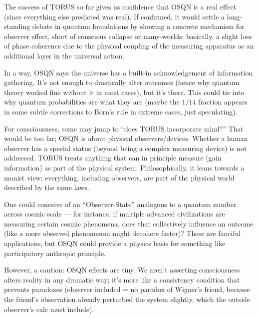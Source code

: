 \documentclass[12pt]{article}
\begin{document}
The success of TORUS so far gives us confidence that OSQN is a real effect (since everything else predicted was real). If confirmed, it would settle a long-standing debate in quantum foundations by showing a concrete mechanism for observer effect, short of conscious collapse or many-worlds: basically, a slight loss of phase coherence due to the physical coupling of the measuring apparatus as an additional layer in the universal action.

In a way, OSQN says the universe has a built-in acknowledgement of information gathering. It’s not enough to drastically alter outcomes (hence why quantum theory worked fine without it in most cases), but it’s there. This could tie into why quantum probabilities are what they are (maybe the $1/14$ fraction appears in some subtle corrections to Born’s rule in extreme cases, just speculating).

For consciousness, some may jump to “does TORUS incorporate mind?” That would be too far; OSQN is about physical observers/devices. Whether a human observer has a special status (beyond being a complex measuring device) is not addressed. TORUS treats anything that can in principle measure (gain information) as part of the physical system. Philosophically, it leans towards a monist view: everything, including observers, are part of the physical world described by the same laws.

One could conceive of an “Observer-State” analogous to a quantum number across cosmic scale — for instance, if multiple advanced civilizations are measuring certain cosmic phenomena, does that collectively influence an outcome (like a more observed phenomenon might decohere faster)? These are fanciful applications, but OSQN could provide a physics basis for something like participatory anthropic principle.

However, a caution: OSQN effects are tiny. We aren’t asserting consciousness alters reality in any dramatic way; it’s more like a consistency condition that prevents paradoxes (observer included = no paradox of Wigner’s friend, because the friend’s observation already perturbed the system slightly, which the outside observer’s calc must include).
\end{document}
